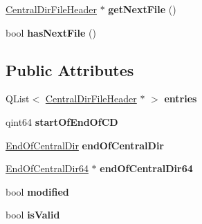 \begin{DoxyCompactItemize}
\item 
\hyperlink{class_central_dir_file_header}{Central\+Dir\+File\+Header} $\ast$ {\bfseries get\+Next\+File} ()\hypertarget{class_zip_central_dir_a056758bcfb0dd19b014cd4835f381782}{}\label{class_zip_central_dir_a056758bcfb0dd19b014cd4835f381782}

\item 
bool {\bfseries has\+Next\+File} ()\hypertarget{class_zip_central_dir_a27557b70b74ee3bc3e1af065e960edda}{}\label{class_zip_central_dir_a27557b70b74ee3bc3e1af065e960edda}

\end{DoxyCompactItemize}
\subsection*{Public Attributes}
\begin{DoxyCompactItemize}
\item 
Q\+List$<$ \hyperlink{class_central_dir_file_header}{Central\+Dir\+File\+Header} $\ast$ $>$ {\bfseries entries}\hypertarget{class_zip_central_dir_a506d248cd5827b0b7f7fc1381ed696f2}{}\label{class_zip_central_dir_a506d248cd5827b0b7f7fc1381ed696f2}

\item 
qint64 {\bfseries start\+Of\+End\+Of\+CD}\hypertarget{class_zip_central_dir_affee080f335ccb6b743eeaf0232da5d7}{}\label{class_zip_central_dir_affee080f335ccb6b743eeaf0232da5d7}

\item 
\hyperlink{class_end_of_central_dir}{End\+Of\+Central\+Dir} {\bfseries end\+Of\+Central\+Dir}\hypertarget{class_zip_central_dir_a9b7624ca3e35243ba2b33e99def96a5c}{}\label{class_zip_central_dir_a9b7624ca3e35243ba2b33e99def96a5c}

\item 
\hyperlink{class_end_of_central_dir64}{End\+Of\+Central\+Dir64} $\ast$ {\bfseries end\+Of\+Central\+Dir64}\hypertarget{class_zip_central_dir_aebcc853396d9d3290fe6a51719549251}{}\label{class_zip_central_dir_aebcc853396d9d3290fe6a51719549251}

\item 
bool {\bfseries modified}\hypertarget{class_zip_central_dir_a408b733a770aa177f5b076a4db519cc3}{}\label{class_zip_central_dir_a408b733a770aa177f5b076a4db519cc3}

\item 
bool {\bfseries is\+Valid}\hypertarget{class_zip_central_dir_af25f4bf2e6a9b4dbc1f2135fc4982f59}{}\label{class_zip_central_dir_af25f4bf2e6a9b4dbc1f2135fc4982f59}


\end{DoxyCompactItemize}
